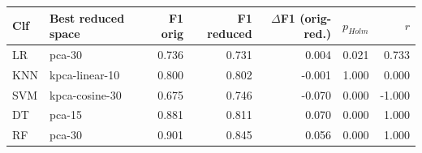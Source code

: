\begin{tabular}{llrrrrr}
\toprule
Clf & Best reduced space & F1 orig & F1 reduced & $\Delta$F1 (orig-red.) & $p_{Holm}$ & $r$ \\
\midrule
LR & pca-30 & 0.736 & 0.731 & 0.004 & 0.021 & 0.733 \\
KNN & kpca-linear-10 & 0.800 & 0.802 & -0.001 & 1.000 & 0.000 \\
SVM & kpca-cosine-30 & 0.675 & 0.746 & -0.070 & 0.000 & -1.000 \\
DT & pca-15 & 0.881 & 0.811 & 0.070 & 0.000 & 1.000 \\
RF & pca-30 & 0.901 & 0.845 & 0.056 & 0.000 & 1.000 \\
\bottomrule
\end{tabular}
